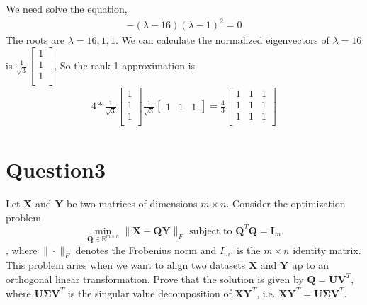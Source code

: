 \documentclass{article}
\newcommand{\R}{\mathbb{R}}
\begin{document}
We need solve the equation, 
\begin{align*}
    -(\lambda - 16)(\lambda - 1)^2 = 0
\end{align*}
The roots are \(\lambda = 16, 1, 1\). 
We can calculate the normalized eigenvectors of \(\lambda = 16\) is \(\frac{1}{\sqrt{3}}\begin{bmatrix}
    1 \\
    1 \\
    1 \\
\end{bmatrix}\),
So the rank-1 approximation is
\begin{align*}
    4 * \frac{1}{\sqrt{3}} \begin{bmatrix}
       1 \\ 
       1 \\ 
       1 \\ 
    \end{bmatrix} \frac{1}{\sqrt{3}} \begin{bmatrix}
        1 & 1 & 1
    \end{bmatrix} = \frac{4}{3} \begin{bmatrix}
        1 & 1 & 1 \\
        1 & 1 & 1 \\
        1 & 1 & 1 \\
    \end{bmatrix}
\end{align*}




\section*{Question3}
Let \(\bm{X}\) and \(\bm{Y}\) be two matrices of dimensions \(m \times n\). Consider the optimization problem \[
    \min_{\bm{Q}\in\R^{m\times n}} \|\bm{X} - \bm{QY}\|_F \text{ subject to } \bm{Q}^T\bm{Q} = \bm{I}_m.
\],
where \(\|\cdot\|_F\) denotes the Frobenius norm and \(I_m\). is the \(m \times n\) identity matrix. This problem aries when we want to align two datasets \(\bm{X} \text{ and }\bm{Y}\) up to an orthogonal linear transformation. Prove that the solution is given by \(\bm{Q} = \bm{U}\bm{V}^T\), where \(\bm{U}\bm{\Sigma}\bm{V}^T\) is the singular value decomposition of \(\bm{XY}^T\), i.e. \(\bm{X}\bm{Y}^T = \bm{U}\bm{\Sigma}\bm{V}^T\).
\end{document}
